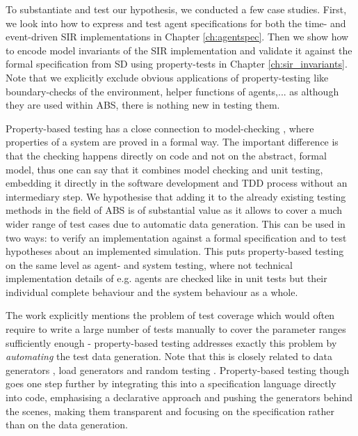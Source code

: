 To substantiate and test our hypothesis, we conducted a few case studies. First, we look into how to express and test agent specifications for both the time- and event-driven SIR implementations in Chapter \ref{ch:agentspec}. Then we show how to encode model invariants of the SIR implementation and validate it against the formal specification from SD using property-tests in Chapter \ref{ch:sir_invariants}. Note that we explicitly exclude obvious applications of property-testing like boundary-checks of the environment, helper functions of agents,... as although they are used within ABS, there is nothing new in testing them.

\medskip

Property-based testing has a close connection to model-checking \cite{mcmillan_symbolic_1993}, where properties of a system are proved in a formal way. The important difference is that the checking happens directly on code and not on the abstract, formal model, thus one can say that it combines model checking and unit testing, embedding it directly in the software development and TDD process without an intermediary step. We hypothesise that adding it to the already existing testing methods in the field of ABS is of substantial value as it allows to cover a much wider range of test cases due to automatic data generation. This can be used in two ways: to verify an implementation against a formal specification and to test hypotheses about an implemented simulation. This puts property-based testing on the same level as agent- and system testing, where not technical implementation details of e.g. agents are checked like in unit tests but their individual complete behaviour and the system behaviour as a whole.

The work \cite{onggo_test-driven_2016} explicitly mentions the problem of test coverage which would often require to write a large number of tests manually to cover the parameter ranges sufficiently enough - property-based testing addresses exactly this problem by \textit{automating} the test data generation. Note that this is closely related to data generators \cite{gurcan_generic_2013}, load generators and random testing \cite{burnstein_practical_2010}. Property-based testing though goes one step further by integrating this into a specification language directly into code, emphasising a declarative approach and pushing the generators behind the scenes, making them transparent and focusing on the specification rather than on the data generation. 